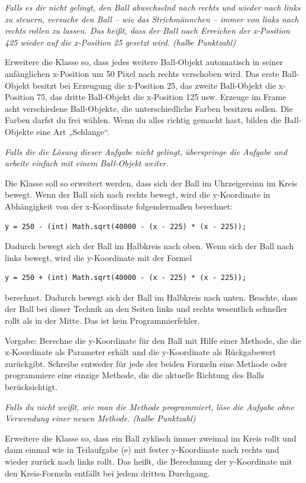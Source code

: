 \begin{compactenum}[a)]
\emph{Falls es dir nicht gelingt, den Ball abwechselnd nach rechts und wieder
nach links zu steuern, versuche den Ball -- wie das Strichmännchen -- immer von
links nach rechts rollen zu lassen. Das heißt, dass der Ball nach Erreichen der
x-Position 425 wieder auf die x-Position 25 gesetzt wird. (halbe Punktzahl)}

\item Erweitere die Klasse  so, dass jedes weitere Ball-Objekt
automatisch in seiner anfänglichen x-Position um 50 Pixel nach rechts
verschoben wird. Das erste Ball-Objekt besitzt bei Erzeugung die x-Position 25,
das zweite Ball-Objekt die x-Position 75, das dritte Ball-Objekt die x-Position 125 usw.
Erzeuge im Frame acht verschiedene Ball-Objekte, die unterschiedliche Farben
besitzen sollen. Die Farben darfst du frei wählen. Wenn du alles richtig
gemacht hast, bilden die Ball-Objekte eine Art „Schlange“.

\emph{Falls dir die Lösung dieser Aufgabe nicht gelingt, überspringe die Aufgabe
und arbeite einfach mit einem Ball-Objekt weiter.}

\item Die Klasse  soll so erweitert werden, dass sich der Ball im
Uhrzeigersinn im Kreis bewegt. Wenn der Ball sich nach rechts bewegt, wird die
y-Koordinate in Abhängigkeit von der x-Koordinate folgendermaßen berechnet:

\begin{lstlisting}
y = 250 - (int) Math.sqrt(40000 - (x - 225) * (x - 225));
\end{lstlisting}

Dadurch bewegt sich der Ball im Halbkreis nach oben. Wenn sich der Ball nach
links bewegt, wird die y-Koordinate mit der Formel

\begin{lstlisting}
y = 250 + (int) Math.sqrt(40000 - (x - 225) * (x - 225));
\end{lstlisting}

berechnet. Dadurch bewegt sich der Ball im Halbkreis nach unten. Beachte, dass
der Ball bei dieser Technik an den Seiten links und rechts wesentlich schneller
rollt als in der Mitte. Das ist kein Programmierfehler.

Vorgabe: Berechne die y-Koordinate für den Ball mit Hilfe einer Methode, die
die x-Koordinate als Parameter erhält und die y-Koordinate als Rückgabewert
zurückgibt. Schreibe entweder für jede der beiden Formeln eine Methode oder
programmiere eine einzige Methode, die die aktuelle Richtung des Balls
berücksichtigt.

\emph{Falls du nicht weißt, wie man die Methode programmiert, löse die Aufgabe
ohne Verwendung einer neuen Methode. (halbe Punktzahl)}

\item Erweitere die Klasse  so, dass ein Ball zyklisch immer
zweimal im Kreis rollt und dann einmal wie in Teilaufgabe (e) mit fester
y-Koordinate nach rechts und wieder zurück nach links rollt. Das heißt, die
Berechnung der y-Koordinate mit den Kreis-Formeln entfällt bei jedem dritten
Durchgang.
\end{compactenum}